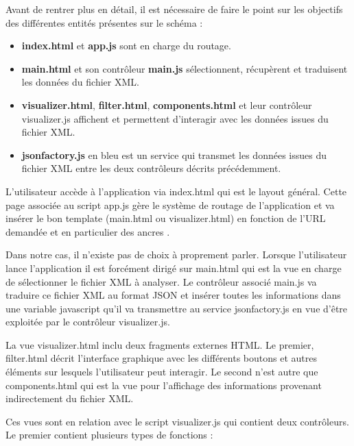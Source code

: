 \documentclass [a4paper,11pt]{article}
\begin{document}
Avant de rentrer plus en détail, il est nécessaire de faire le point sur les objectifs des différentes entités présentes sur le schéma :
\newline

\begin{itemize}
 \item \textbf{index.html} et \textbf{app.js} sont en charge du routage.
 \item \textbf{main.html} et son contrôleur \textbf{main.js} sélectionnent, récupèrent et traduisent les données du fichier XML.
 \item \textbf{visualizer.html}, \textbf{filter.html}, \textbf{components.html} et leur contrôleur visualizer.js affichent et permettent d’interagir avec les données issues du fichier XML.
 \item \textbf{jsonfactory.js} en bleu est un service qui transmet les données issues du fichier XML entre les deux contrôleurs décrits précédemment.
 \newline
\end{itemize}

L’utilisateur accède à l’application via index.html qui est le layout général. Cette page associée au script app.js gère le système de routage de l’application et va insérer le bon template (main.html ou visualizer.html) en fonction de l’URL demandée et en particulier des ancres \cite{Landazuri16}.
\newline

Dans notre cas, il n’existe pas de choix à proprement parler. Lorsque l’utilisateur lance l’application il est forcément dirigé sur main.html qui est la vue en charge de sélectionner le fichier XML à analyser. Le contrôleur associé main.js va traduire ce fichier XML au format JSON et insérer toutes les informations dans une variable javascript qu’il va transmettre au service jsonfactory.js en vue d’être exploitée par le contrôleur visualizer.js.
\newline

La vue visualizer.html inclu deux fragments externes HTML. Le premier, filter.html décrit l’interface graphique avec les différents boutons et autres éléments sur lesquels l’utilisateur peut interagir. Le second n’est autre que components.html qui est la vue pour l’affichage des informations provenant indirectement du fichier XML.
\newline

Ces vues sont en relation avec le script visualizer.js qui contient deux contrôleurs. Le premier contient plusieurs types de fonctions :
\newline
\end{document}

